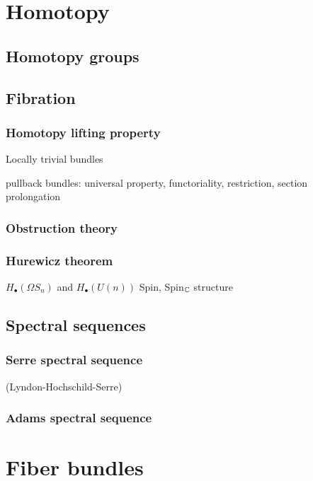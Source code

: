 \documentclass{../../large}
\begin{document}
\part{Homotopy}

\chapter{Homotopy groups}




\chapter{Fibration}
\section{Homotopy lifting property}


Locally trivial bundles

pullback bundles: universal property, functoriality, restriction,
section prolongation

\section{Obstruction theory}
\section{Hurewicz theorem}
$H_\bullet(\Omega S_n)$ and $H_\bullet(U(n))$
Spin, Spin$_{\mathbb{C}}$ structure



\chapter{Spectral sequences}
\section{Serre spectral sequence}
	(Lyndon-Hochschild-Serre)
\section{Adams spectral sequence}











\part{Fiber bundles}
\end{document}
